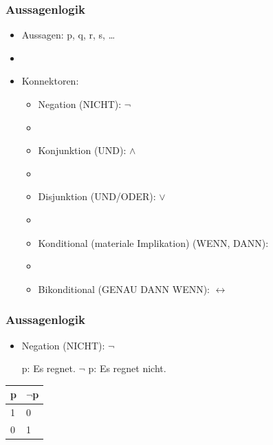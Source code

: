\begin{frame}
\frametitle{Aussagenlogik}

\begin{itemize}
	\item Aussagen: p, q, r, s, \dots
	\item[]
	\item Konnektoren:
	
	\begin{itemize}
		\item Negation (NICHT): $\lnot$
		\item[]
		\item Konjunktion (UND): $\land$
		\item[]
		\item Disjunktion (UND/ODER): $\lor$
		\item[]
		\item Konditional (materiale Implikation) (WENN, DANN): \ras
		\item[]
		\item Bikonditional (GENAU DANN WENN): $\leftrightarrow$
	\end{itemize}
	
\end{itemize}

\end{frame}



\begin{frame}
\frametitle{Aussagenlogik}

\begin{itemize}
	\item Negation (NICHT): $\lnot$
	
	\eal
		\ex p: Es regnet.
		\ex $\lnot$ p: Es regnet nicht.
	\zl
	
\end{itemize}

\begin{table}
\centering
\begin{tabular}{p{3cm}|p{3cm}}
\textbf{p} & \textbf{$\lnot$p}\\
\hline
1 & 0\\
\hline
0 & 1\\
\end{tabular}
\end{table}

\end{frame}




